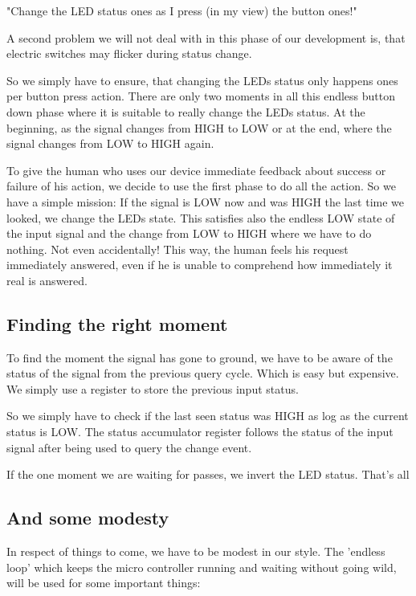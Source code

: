 "Change the LED status ones as I press (in my view) the button ones!"

A second problem we will not deal with in this phase of our development is, that electric switches may flicker during status change.

So we simply have to ensure, that changing the LEDs status only happens ones per button press action. There are only two moments in all this endless button down phase where it is suitable to really change the LEDs status. At the beginning, as the signal changes from HIGH to LOW or at the end, where the signal changes from LOW to HIGH again.

To give the human who uses our device immediate feedback about success or failure of his action, we decide to use the first phase to do all the action. So we have a simple mission: If the signal is LOW now and was HIGH the last time we looked, we change the LEDs state. This satisfies also the endless LOW state of the input signal and the change from LOW to HIGH where we have to do nothing. Not even accidentally! This way, the human feels his request immediately answered, even if he is unable to comprehend how immediately it real is answered.


\subsection{Finding the right moment}

To find the moment the signal has gone to ground, we have to be aware of the status of the signal from the previous query cycle. Which is easy but expensive. We simply use a register to store the previous input status.

So we simply have to check if the last seen status was HIGH as log as the current status is LOW. The status accumulator register follows the status of the input signal after being used to query the change event.

If the one moment we are waiting for passes, we invert the LED status. That's all

\subsection{And some modesty}

In respect of things to come, we have to be modest in our style. The 'endless loop' which keeps the micro controller running and waiting without going wild, will be used for some important things:

